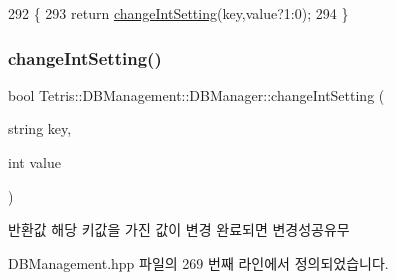 \begin{DoxyCode}
292                                                          \{
293                 \textcolor{keywordflow}{return} \hyperlink{class_tetris_1_1_d_b_management_1_1_d_b_manager_aead8bb3f2a64fdf6ac59c69bfd21a01e}{changeIntSetting}(key,value?1:0);
294             \}
\end{DoxyCode}
\mbox{\label{class_tetris_1_1_d_b_management_1_1_d_b_manager_aead8bb3f2a64fdf6ac59c69bfd21a01e}} 
\subsubsection{\texorpdfstring{change\+Int\+Setting()}{changeIntSetting()}}
{\footnotesize\ttfamily bool Tetris\+::\+D\+B\+Management\+::\+D\+B\+Manager\+::change\+Int\+Setting (\begin{DoxyParamCaption}\item[{string}]{key,  }\item[{int}]{value }\end{DoxyParamCaption})\hspace{0.3cm}{\ttfamily [inline]}}

\begin{DoxyReturn}{반환값}
해당 키값을 가진 값이 변경 완료되면 변경성공유무 
\end{DoxyReturn}


D\+B\+Management.\+hpp 파일의 269 번째 라인에서 정의되었습니다.


